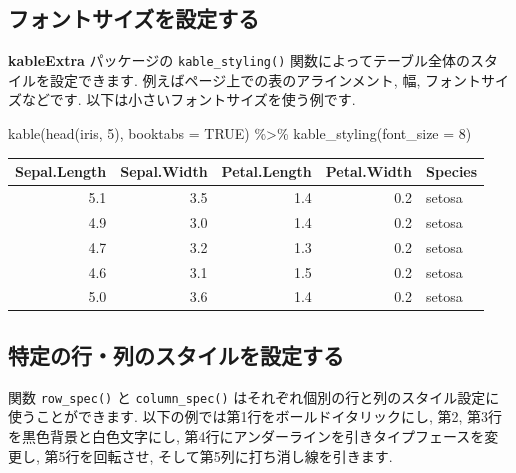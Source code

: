 \documentclass[
  11pt,
  lualatex,
  ja=standard]{bxjsreport}
\newenvironment{Shaded}{\begin{snugshade}}{\end{snugshade}}
\newcommand{\AttributeTok}[1]{\textcolor[rgb]{0.77,0.63,0.00}{#1}}
\newcommand{\ConstantTok}[1]{\textcolor[rgb]{0.00,0.00,0.00}{#1}}
\newcommand{\DecValTok}[1]{\textcolor[rgb]{0.00,0.00,0.81}{#1}}
\newcommand{\FunctionTok}[1]{\textcolor[rgb]{0.00,0.00,0.00}{#1}}
\newcommand{\NormalTok}[1]{#1}
\newcommand{\SpecialCharTok}[1]{\textcolor[rgb]{0.00,0.00,0.00}{#1}}
\begin{document}
\hypertarget{set-the-font-size}{%
\subsection{フォントサイズを設定する}\label{set-the-font-size}}

\textbf{kableExtra} パッケージの \texttt{kable\_styling()} 関数によってテーブル全体のスタイルを設定できます. 例えばページ上での表のアラインメント, 幅, フォントサイズなどです. 以下は小さいフォントサイズを使う例です.

\begin{Shaded}
\begin{Highlighting}[numbers=left,,]
\FunctionTok{kable}\NormalTok{(}\FunctionTok{head}\NormalTok{(iris, }\DecValTok{5}\NormalTok{), }\AttributeTok{booktabs =} \ConstantTok{TRUE}\NormalTok{) }\SpecialCharTok{\%\textgreater{}\%}
  \FunctionTok{kable\_styling}\NormalTok{(}\AttributeTok{font\_size =} \DecValTok{8}\NormalTok{)}
\end{Highlighting}
\end{Shaded}

\begin{table}
\centering\begingroup\fontsize{8}{10}\selectfont

\begin{tabular}{rrrrl}
\toprule
Sepal.Length & Sepal.Width & Petal.Length & Petal.Width & Species\\
\midrule
5.1 & 3.5 & 1.4 & 0.2 & setosa\\
4.9 & 3.0 & 1.4 & 0.2 & setosa\\
4.7 & 3.2 & 1.3 & 0.2 & setosa\\
4.6 & 3.1 & 1.5 & 0.2 & setosa\\
5.0 & 3.6 & 1.4 & 0.2 & setosa\\
\bottomrule
\end{tabular}
\endgroup{}
\end{table}

\hypertarget{style-specific-rows-columns}{%
\subsection{特定の行・列のスタイルを設定する}\label{style-specific-rows-columns}}

関数 \texttt{row\_spec()} と \texttt{column\_spec()} はそれぞれ個別の行と列のスタイル設定に使うことができます. 以下の例では第1行をボールドイタリックにし, 第2, 第3行を黒色背景と白色文字にし, 第4行にアンダーラインを引きタイプフェースを変更し, 第5行を回転させ, そして第5列に打ち消し線を引きます.
\end{document}
